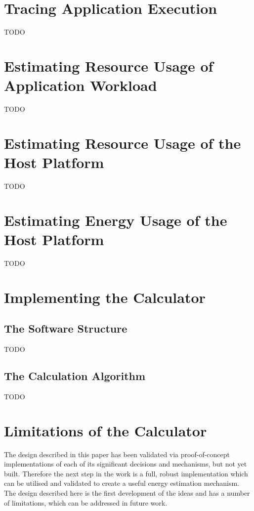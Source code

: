 \section{Tracing Application Execution}

TODO

\section{Estimating Resource Usage of Application Workload}

TODO

\section{Estimating Resource Usage of the Host Platform}

TODO

\section{Estimating Energy Usage of the Host Platform}

TODO

\section{Implementing the Calculator}

\subsection{The Software Structure}

TODO

\subsection{The Calculation Algorithm}

TODO

\section{Limitations of the Calculator}

The design described in this paper has been validated via proof-of-concept implementations of each of its significant decisions and mechanisms, but not yet built.  Therefore the next step in the work is a full, robust implementation which can be utilised and validated to create a useful energy estimation mechanism.
The design described here is the first development of the ideas and has a number of limitations, which can be addressed in future work.

